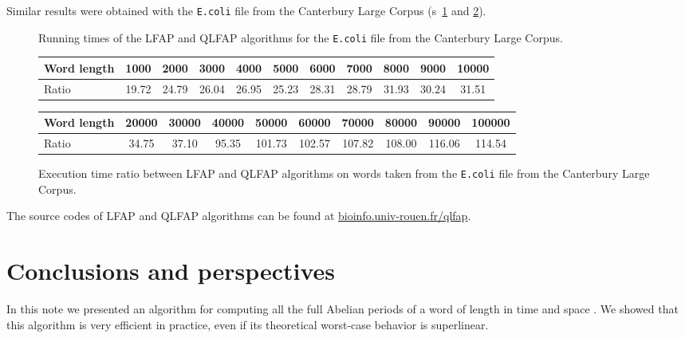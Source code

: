 \documentclass[3p]{elsarticle}
\begin{document}
Similar results were obtained with the \texttt{E.coli} file from the Canterbury Large Corpus
 (\figurename s~\ref{fig-expe-ecoli} and \ref{fig-ratio-ecoli}).

\begin{figure}
\caption{
\label{fig-expe-ecoli}
Running times of the LFAP and QLFAP algorithms for
the \texttt{E.coli} file from the Canterbury Large Corpus.
}
\end{figure}

\begin{figure}
\begin{center}
\begin{tabular}{|l|c|c|c|c|c|c|c|c|c|c|}
\hline
Word length & {\small 1000}&{\small 2000}&{\small 3000}&{\small 4000}&{\small 5000}&{\small 6000}&{\small 7000}&{\small 8000}&{\small 9000}&{\small 10000}\\
\hline
Ratio &
19.72 &
24.79&
26.04 &
26.95&
25.23&
28.31 &
28.79 &
31.93&
30.24&
31.51
\\
\hline
\end{tabular}

\begin{tabular}{|l|c|c|c|c|c|c|c|c|c|}
\hline
Word length &
{\small 20000}&{\small 30000}&{\small 40000}&{\small 50000}&{\small 60000}&{\small 70000}&{\small 80000}&{\small 90000}&{\small 100000}\\
\hline
Ratio &
34.75 &
37.10 &
95.35 &
101.73 &
102.57 &
107.82&
108.00&
116.06&
114.54
\\
\hline
\end{tabular}
\end{center}
\caption{\label{fig-ratio-ecoli}Execution time ratio between LFAP and QLFAP algorithms on
 words taken from the \texttt{E.coli} file from the Canterbury Large Corpus.
}
\end{figure}

The source codes of LFAP and QLFAP algorithms can be found at
 \url{bioinfo.univ-rouen.fr/qlfap}.

\section{Conclusions and perspectives}\label{sec-conc}


In this note we presented an algorithm for computing all the full Abelian periods of a word of length  in time  and space . We showed that this algorithm is very efficient in practice, even if its theoretical worst-case behavior is superlinear.
\end{document}
